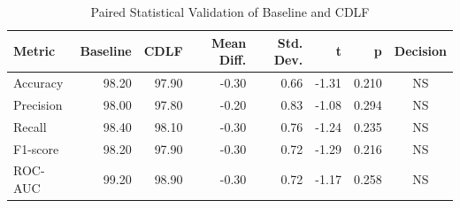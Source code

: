 \begin{table}[htbp]
\centering
\caption{Paired Statistical Validation of Baseline and CDLF}
\label{tab:statistical}
\scriptsize
\begin{tabular}{|l|r|r|r|r|r|r|c|}
\hline
\textbf{Metric} & \textbf{Baseline} & \textbf{CDLF} & \textbf{Mean Diff.} & \textbf{Std. Dev.} & \textbf{t} & \textbf{p} & \textbf{Decision}\\
\hline
Accuracy & 98.20 & 97.90 & -0.30 & 0.66 & -1.31 & 0.210 & NS\\
Precision & 98.00 & 97.80 & -0.20 & 0.83 & -1.08 & 0.294 & NS\\
Recall & 98.40 & 98.10 & -0.30 & 0.76 & -1.24 & 0.235 & NS\\
F1-score & 98.20 & 97.90 & -0.30 & 0.72 & -1.29 & 0.216 & NS\\
ROC-AUC & 99.20 & 98.90 & -0.30 & 0.72 & -1.17 & 0.258 & NS\\
\hline
\end{tabular}
\end{table}

